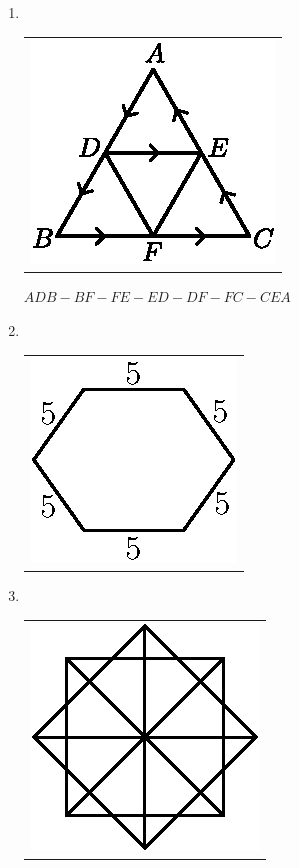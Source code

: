 \begin{enumerate}
\item 
~

  \vskip -0.5cm
  
\begin{tabular}[t]{c}
\centering
\includegraphics{src/figures/ans34.eps}
\end{tabular}
$ADB - BF - FE-ED-DF-FC-CEA$

\bigskip

\item 
~

  \vskip -0.5cm
  
\begin{tabular}[t]{c}
\centering
\includegraphics{src/figures/ans35.eps}
\end{tabular}

\bigskip

\item 
~

  \vskip -0.5cm
  
\begin{tabular}[t]{c}
\centering
\includegraphics{src/figures/ans36.eps}
\end{tabular}


\end{enumerate}
